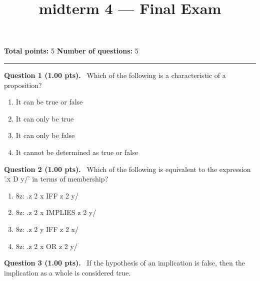 \documentclass[12pt,a4paper]{article}
\title{midterm 4 — Final Exam}
\date{}
\begin{document}
\maketitle



\noindent
\textbf{Total points:} 5
\hfill
\textbf{Number of questions:} 5

\vspace{1em}
\hrule
\vspace{1.5em}


\noindent
\textbf{Question 1 (1.00 pts).}~
Which of the following is a characteristic of a proposition?


\begin{enumerate}[label=\textbf{\Alph*.}]

  \item It can be true or false

  \item It can only be true

  \item It can only be false

  \item It cannot be determined as true or false

\end{enumerate}



\vspace{0.5em}


\noindent
\textbf{Question 2 (1.00 pts).}~
Which of the following is equivalent to the expression '.x D y/' in terms of membership?


\begin{enumerate}[label=\textbf{\Alph*.}]

  \item 8z: .z 2 x IFF z 2 y/

  \item 8z: .z 2 x IMPLIES z 2 y/

  \item 8z: .z 2 y IFF z 2 x/

  \item 8z: .z 2 x OR z 2 y/

\end{enumerate}



\vspace{0.5em}


\noindent
\textbf{Question 3 (1.00 pts).}~
If the hypothesis of an implication is false, then the implication as a whole is considered true.
\end{document}

